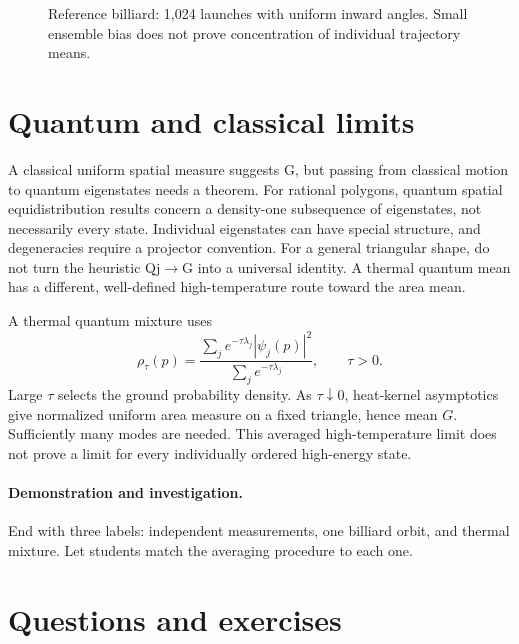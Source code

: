 \documentclass[11pt,oneside,openany]{book}
\begin{document}
\begin{figure}[htbp]
\caption[Reference billiard: 1,024 launches with uniform inward angles]{Reference billiard: 1,024 launches with uniform inward angles. Small ensemble bias does not prove concentration of individual trajectory means.}\label{fig:billiard}
\end{figure}

\section{Quantum and classical limits}\label{sec:slide60}

A classical uniform spatial measure suggests G, but passing from classical motion to quantum eigenstates needs a theorem. For rational polygons, quantum spatial equidistribution results concern a density-one subsequence of eigenstates, not necessarily every state. Individual eigenstates can have special structure, and degeneracies require a projector convention. For a general triangular shape, do not turn the heuristic Qj\ensuremath{\to}G into a universal identity. A thermal quantum mean has a different, well-defined high-temperature route toward the area mean.


A thermal quantum mixture uses
\[
\rho_\tau(p)=
\frac{\sum_j e^{-\tau\lambda_j}|\psi_j(p)|^2}
{\sum_j e^{-\tau\lambda_j}},\qquad \tau>0.
\]
Large $\tau$ selects the ground probability density.
As $\tau\downarrow0$, heat-kernel asymptotics give normalized uniform
area measure on a fixed triangle, hence mean $G$. Sufficiently many
modes are needed. This averaged high-temperature limit does not prove
a limit for every individually ordered high-energy state.



\paragraph{Demonstration and investigation.} End with three labels: independent measurements, one billiard orbit, and thermal mixture. Let students match the averaging procedure to each one.


\section*{Questions and exercises}
\end{document}
